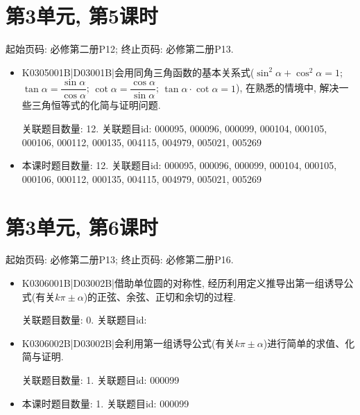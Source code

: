 \section*{第3单元, 第5课时}
起始页码: 必修第二册P12; 终止页码: 必修第二册P13.
\begin{itemize}
\item K0305001B|D03001B|会用同角三角函数的基本关系式($\sin^2\alpha+\cos^2\alpha=1$; $\tan\alpha=\dfrac{\sin\alpha}{\cos\alpha}$; $\cot\alpha=\dfrac{\cos\alpha}{\sin\alpha}$; $\tan\alpha\cdot \cot\alpha=1$), 在熟悉的情境中, 解决一些三角恒等式的化简与证明问题.

关联题目数量: 12. 关联题目id: 000095, 000096, 000099, 000104, 000105, 000106, 000112, 000135, 004115, 004979, 005021, 005269

\item 本课时题目数量: 12. 关联题目id: 000095, 000096, 000099, 000104, 000105, 000106, 000112, 000135, 004115, 004979, 005021, 005269

\end{itemize}

\section*{第3单元, 第6课时}
起始页码: 必修第二册P13; 终止页码: 必修第二册P16.
\begin{itemize}
\item K0306001B|D03002B|借助单位圆的对称性, 经历利用定义推导出第一组诱导公式(有关$k\pi\pm \alpha$)的正弦、余弦、正切和余切的过程.

关联题目数量: 0. 关联题目id: 

\item K0306002B|D03002B|会利用第一组诱导公式(有关$k\pi\pm \alpha$)进行简单的求值、化简与证明.

关联题目数量: 1. 关联题目id: 000099

\item 本课时题目数量: 1. 关联题目id: 000099

\end{itemize}

